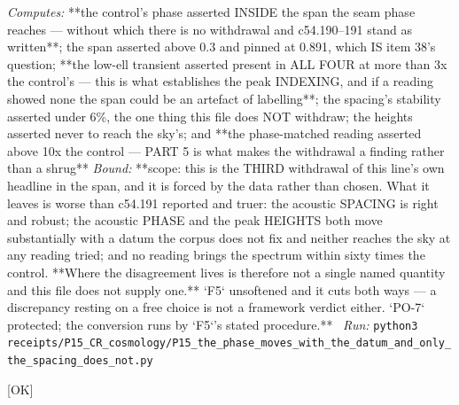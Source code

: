 \begin{description}
\emph{Computes:} **the control's phase asserted INSIDE the span the seam phase reaches --- without which there is no withdrawal and c54.190--191 stand as written**; the span asserted above 0.3 and pinned at 0.891, which IS item 38's question; **the low-ell transient asserted present in ALL FOUR at more than 3x the control's --- this is what establishes the peak INDEXING, and if a reading showed none the span could be an artefact of labelling**; the spacing's stability asserted under 6\%, the one thing this file does NOT withdraw; the heights asserted never to reach the sky's; and **the phase-matched reading asserted above 10x the control --- PART 5 is what makes the withdrawal a finding rather than a shrug**
 \emph{Bound:} **scope: this is the THIRD withdrawal of this line's own headline in the span, and it is forced by the data rather than chosen. What it leaves is worse than c54.191 reported and truer: the acoustic SPACING is right and robust; the acoustic PHASE and the peak HEIGHTS both move substantially with a datum the corpus does not fix and neither reaches the sky at any reading tried; and no reading brings the spectrum within sixty times the control. **Where the disagreement lives is therefore not a single named quantity and this file does not supply one.** `F5` unsoftened and it cuts both ways --- a discrepancy resting on a free choice is not a framework verdict either. `PO-7` protected; the conversion runs by `F5`'s stated procedure.**
\ \emph{Run:} \texttt{python3 receipts/P15\_CR\_cosmology/P15\_the\_phase\_moves\_with\_the\_datum\_and\_only\_the\_spacing\_does\_not.py}
\item[\label{rcpt:P15_the_locus_was_wrong_in_six_places_and_the_lint_could_not_see_the_worst}\texttt{P15\_the\_locus\_was\_wrong\_in\_six\_places\_and\_the\_lint\_could\_not\_see\_the\_worst}]\hfill\textsf{[OK]}\\

\end{description}

